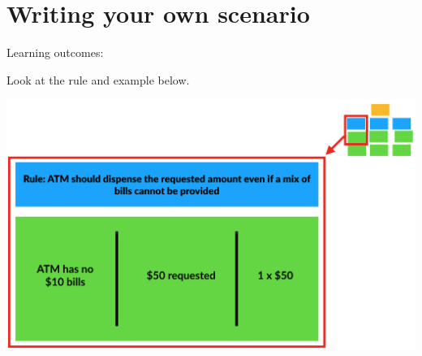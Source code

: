 \chapter*{Writing your own scenario}

\ifnotes

    Learning outcomes:

\fi

\ifcontent
    Look at the rule and example below.

    \begin{center}
        \includegraphics[width=\textwidth]{../bdd-fundamentals/images/rule-and-example}
        
    \end{center}



\fi